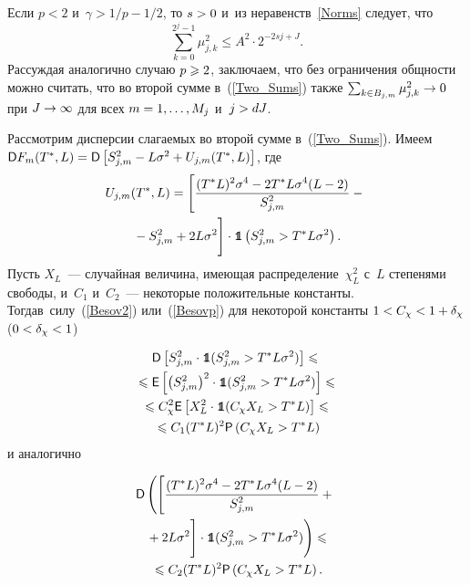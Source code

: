 \begin{multicols}{2}
Если $p<2$ и~$\gamma>1/p-1/2$, то $s\hm>0$ и~из неравенств~\eqref{Norms} следует, 
что
\begin{equation}
\label{Besovp}
\sum\limits_{k=0}^{2^j-1}\mu_{j,k}^2 \leqslant A^2\cdot 2^{-2s j+J}.
\end{equation}
Рассуждая аналогично случаю $p\hm\geqslant2$, заключаем, что без ограничения общности 
можно считать, что во второй сумме в~(\ref{Two_Sums}) также $\sum\nolimits_{k\in B_{j,m}}\mu_{j,k}^2\hm\to0$ при $J\hm\to\infty$ для всех $m\hm=1,\ldots,M_j$ и~$j\hm>dJ$.

Рассмотрим дисперсии слагаемых во второй сумме в~(\ref{Two_Sums}). Имеем 
${\sf D} F_m(T^*,L)\hm={\sf D} \left[S^2_{j,m}\hm-L\sigma^2\hm+U_{j,m}(T^*,L)\right]$, где
\begin{multline*}
U_{j,m}(T^*,L)=\left[\fr{(T^*L)^2\sigma^4-2T^*L\sigma^4(L-2)}{S_{j,m}^2}-{}\right.\\
\left.{}-
S_{j,m}^2 +2L\sigma^2
\vphantom{\fr{(T^*L)^2\sigma^4-2T^*L\sigma^4(L-2)}{S_{j,m}^2}}
\right]\cdot \Ik\left(S^2_{j,m}>T^*L\sigma^2\right).
\end{multline*}
Пусть $X_{L}$~--- случайная величина, имеющая распределение~$\chi^2_{L}$ с~$L$ 
степенями свободы, и~$C_1$ и~$C_2$~--- некоторые положительные константы.
Тогда\linebreak в~силу~(\ref{Besov2}) или~(\ref{Besovp}) для некоторой константы 
$1\hm<C_\chi\hm<1\hm+\delta_\chi$ ($0\hm<\delta_\chi\hm<1$)

\vspace*{-6pt}

\noindent
\begin{multline*}
{\sf D}\left[S_{j,m}^2\cdot \mbox{{{\tt 1}}\hspace{-1.3mm}{\sf 1}}(S^2_{j,m}>T^*L\sigma^2)\right]\leqslant{}\\
{}\leqslant {\sf E} 
\left[\left(S_{j,m}^2\right)^2\cdot \mbox{{{\tt 1}}\hspace{-1.3mm}{\sf 1}}(S^2_{j,m}>T^*L\sigma^2)\right]\leqslant{}\\
{}\leqslant C^2_\chi{\sf E}\left[X^2_{L}\cdot \mbox{{{\tt 1}}\hspace{-1.3mm}{\sf 1}}(C_\chi X_{L}>T^*L)\right]\leqslant{}\\
{}\leqslant 
C_1(T^*L)^2{\sf P}\left(C_\chi X_{L}>T^*L\right)
\end{multline*}
и аналогично

\vspace*{-6pt}

\noindent
\begin{multline*}
{\sf D}\left(\left[\fr{(T^*L)^2\sigma^4-2T^*L\sigma^4(L-2)}
{S_{j,m}^2}+{}\right.\right.\\
\left.\left.{}+2L\sigma^2
\vphantom{\fr{(T^*L)^2\sigma^4-2T^*L\sigma^4(L-2)}{S_{j,m}^2}}
\right]\cdot \Ik(S^2_{j,m}>T^*L\sigma^2)\right)\leqslant {}\\
{}\leqslant
C_2(T^*L)^2{\sf P}\left(C_\chi X_{L}>T^*L\right).
\end{multline*}


\end{multicols}
